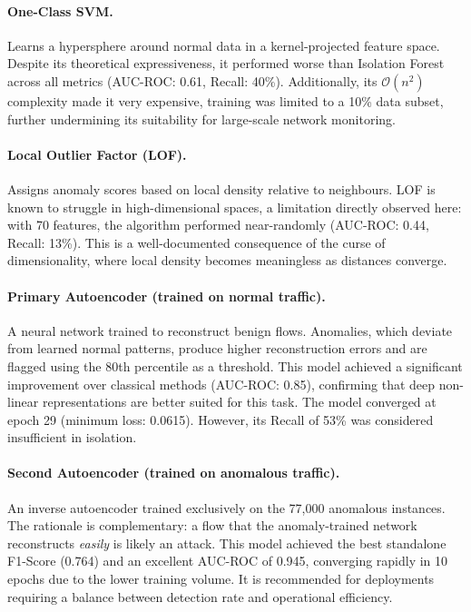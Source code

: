 \documentclass[11pt]{article}
\begin{document}
\paragraph{One-Class SVM.} Learns a hypersphere around normal data in a kernel-projected feature space. Despite its theoretical expressiveness, it performed worse than Isolation Forest across all metrics (AUC-ROC: 0.61, Recall: 40\%). Additionally, its $\mathcal{O}(n^2)$ complexity made it very expensive, training was limited to a 10\% data subset, further undermining its suitability for large-scale network monitoring.

\paragraph{Local Outlier Factor (LOF).} Assigns anomaly scores based on local density relative to neighbours. LOF is known to struggle in high-dimensional spaces, a limitation directly observed here: with 70 features, the algorithm performed near-randomly (AUC-ROC: 0.44, Recall: 13\%). This is a well-documented consequence of the curse of dimensionality, where local density becomes meaningless as distances converge.

\paragraph{Primary Autoencoder (trained on normal traffic).} A neural network trained to reconstruct benign flows. Anomalies, which deviate from learned normal patterns, produce higher reconstruction errors and are flagged using the 80th percentile as a threshold. This model achieved a significant improvement over classical methods (AUC-ROC: 0.85), confirming that deep non-linear representations are better suited for this task. The model converged at epoch 29 (minimum loss: 0.0615). However, its Recall of 53\% was considered insufficient in isolation.

\paragraph{Second Autoencoder (trained on anomalous traffic).} An inverse autoencoder trained exclusively on the 77,000 anomalous instances. The rationale is complementary: a flow that the anomaly-trained network reconstructs \textit{easily} is likely an attack. This model achieved the best standalone F1-Score (0.764) and an excellent AUC-ROC of 0.945, converging rapidly in 10 epochs due to the lower training volume. It is recommended for deployments requiring a balance between detection rate and operational efficiency.
\end{document}
